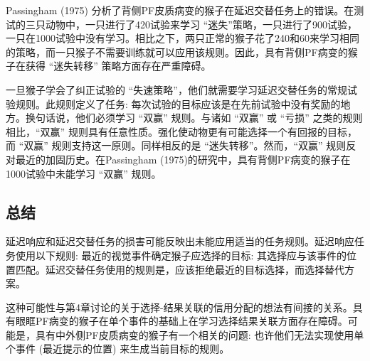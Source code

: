 Passingham (1975) 分析了背侧PF皮质病变的猴子在延迟交替任务上的错误。在测试的三只动物中，一只进行了420试验来学习 “迷失”策略，一只进行了900试验，一只在1000试验中没有学习。相比之下，两只正常的猴子花了240和60来学习相同的策略，而一只猴子不需要训练就可以应用该规则。因此，具有背侧PF病变的猴子在获得 “迷失转移” 策略方面存在严重障碍。

一旦猴子学会了纠正试验的 “失速策略”，他们就需要学习延迟交替任务的常规试验规则。此规则定义了任务: 每次试验的目标应该是在先前试验中没有奖励的地方。换句话说，他们必须学习 “双赢” 规则。与诸如 “双赢” 或 “亏损” 之类的规则相比，“双赢” 规则具有任意性质。强化使动物更有可能选择一个有回报的目标，而 “双赢” 规则支持这一原则。同样相反的是 “迷失转移”。然而，“双赢” 规则反对最近的加固历史。在Passingham (1975)的研究中，具有背侧PF病变的猴子在1000试验中未能学习 “双赢” 规则。
\subsection{总结}
延迟响应和延迟交替任务的损害可能反映出未能应用适当的任务规则。延迟响应任务使用以下规则: 最近的视觉事件确定猴子应选择的目标: 其选择应与该事件的位置匹配。延迟交替任务使用的规则是，应该拒绝最近的目标选择，而选择替代方案。

这种可能性与第4章讨论的关于选择-结果关联的信用分配的想法有间接的关系。具有眼眶PF病变的猴子在单个事件的基础上在学习选择结果关联方面存在障碍。可能是，具有中外侧PF皮质病变的猴子有一个相关的问题: 也许他们无法实现使用单个事件 (最近提示的位置) 来生成当前目标的规则。

